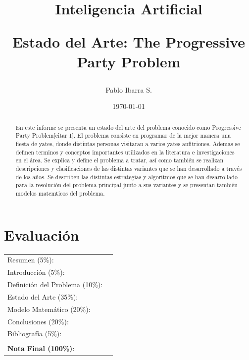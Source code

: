 \documentclass[spanish, fleqn]{article}
\begin{document}
\title{Inteligencia Artificial \\ \begin{Large}Estado del Arte: The Progressive Party Problem\end{Large}}
\author{Pablo Ibarra S.}
\date{\today}
\maketitle

\section*{Evaluación}

\begin{tabular}{ll}
Resumen (5\%): & \underline{\hspace{2cm}} \\
Introducción (5\%):  & \underline{\hspace{2cm}} \\
Definición del Problema (10\%):  & \underline{\hspace{2cm}} \\
Estado del Arte (35\%):  & \underline{\hspace{2cm}} \\
Modelo Matemático (20\%): &  \underline{\hspace{2cm}}\\
Conclusiones (20\%): &  \underline{\hspace{2cm}}\\
Bibliografía (5\%): & \underline{\hspace{2cm}}\\
 &  \\
\textbf{Nota Final (100\%)}:   & \underline{\hspace{2cm}}
\end{tabular}

\begin{abstract}
En este informe se presenta un estado del arte del problema conocido como Progressive Party Problem[citar 1]. El problema consiste en programar de la mejor manera una fiesta de yates, donde distintas personas visitaran a varios yates anfitriones. Ademas se definen terminos y conceptos importantes utilizados en la literatura e investigaciones en el área. Se explica y define el problema a tratar, así como también se realizan descripciones y clasificaciones de las distintas variantes que se han desarrollado a través de los años. Se describen las distintas estrategias y algoritmos que se han desarrollado para la resolución del problema principal junto a sus variantes y se presentan también modelos matemticos del problema.
\end{abstract}
\end{document}
